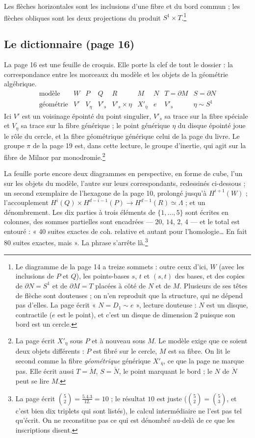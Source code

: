 \documentclass[11pt,a4paper]{article}
\begin{document}
Les flèches horizontales sont les inclusions d'une fibre et du bord
commun ; les flèches obliques sont les deux projections du produit
$S^{1} \times T$.\footnote{Le diagramme de la page 14 a treize sommets : outre
ceux d'ici, $W$ (avec les inclusions de $P$ et $Q$), les points-bases $s$, $t$
et $(s, t)$ des bases, et des copies de $\partial N = S^{1}$ et de
$\partial M = T$ placées à côté de $N$ et de $M$. Plusieurs de ses têtes de
flèche sont douteuses ; on n'en reproduit que la structure, qui ne dépend pas
d'elles. La page écrit « $N = D_{1} \sim e$ », lecture douteuse : $N$ est un
disque, contractile ($e$ est le point), et c'est un disque de dimension $2$
puisque son bord est un cercle.}

\subsection*{Le dictionnaire (page 16)}

La page 16 est une feuille de croquis. Elle porte la clef de tout le dossier :
la correspondance entre les morceaux du modèle et les objets de la géométrie
algébrique.
\[
  \begin{array}{c|cccc|cccc}
    \text{modèle} & W & P & Q & R & M & N & T = \partial M & S = \partial N \\ \hline
    \text{géométrie} & V' & V_{\eta} & V'_{s} & V'_{s} \times \eta
      & X'_{\bar\eta} & e & V'_{s} & \eta \sim S^{1}
  \end{array}
\]
Ici $V'$ est un voisinage épointé du point singulier, $V'_{s}$ sa trace sur la
fibre spéciale et $V_{\eta}$ sa trace sur la fibre générique ; le point
générique $\eta$ du disque épointé joue le rôle du cercle, et la fibre
géométrique générique celui de la page du livre. Le groupe $\pi$ de la page
19 est, dans cette lecture, le groupe d'inertie, qui agit sur la fibre de
Milnor par monodromie.\footnote{La page écrit $X'_{\eta}$ sous $P$ et à nouveau
sous $M$. Le modèle exige que ce soient deux objets différents : $P$ est fibré
sur le cercle, $M$ est sa fibre. On lit le second comme la fibre
\emph{géométrique} générique $X'_{\bar\eta}$, ce que la page ne marque pas.
Elle écrit aussi $T = \dot{M}$, $S = \dot{N}$, le point marquant le bord ; le
$N$ de $\dot{N}$ peut se lire $M$.}

La feuille porte encore deux diagrammes en perspective, en forme de cube, l'un
sur les objets du modèle, l'autre sur leurs correspondants, redessinés
ci-dessous ; un second exemplaire de l'hexagone de la page 10, prolongé jusqu'à
$H^{i+1}(W)$ ; l'accouplement
$H^{i}(Q) \times H^{d-i-1}(P) \to H^{d-1}(R) \simeq \Lambda$ ; et un
dénombrement. Les dix parties à trois éléments de $\{1, \ldots, 5\}$ sont
écrites en colonnes, des sommes partielles sont encadrées — $20$, $14$, $2$,
$4$ — et le total est entouré : « 40 suites exactes de coh. relative et autant
pour l'homologie… En fait 80 suites exactes, mais ». La phrase s'arrête
là.\footnote{La page écrit
$\binom{5}{2} = \frac{5.4.3}{12.} = 10$ ; le résultat $10$ est juste
($\binom{5}{2} = \binom{5}{3}$, et c'est bien dix triplets qui sont listés),
le calcul intermédiaire ne l'est pas tel qu'écrit. On ne reconstitue pas ce qui
est dénombré au-delà de ce que les inscriptions disent.}
\end{document}
